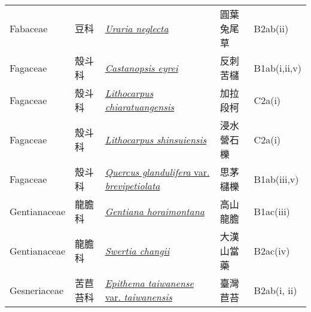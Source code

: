 {\begin{longtable}{L{2.5cm}L{2cm}L{5cm}L{2.5cm}L{3cm}}
    Fabaceae & 豆科 & \href{http://www.theplantlist.org/tpl1.1/search?q=Uraria+neglecta}{\textit{Uraria neglecta} } & 圓葉兔尾草 & B2ab(ii)    \\
    Fagaceae & 殼斗科 & \href{http://www.theplantlist.org/tpl1.1/search?q=Castanopsis+eyrei}{\textit{Castanopsis eyrei} } & 反刺苦櫧 & B1ab(i,ii,v)    \\
    Fagaceae & 殼斗科 & \href{http://www.theplantlist.org/tpl1.1/search?q=Lithocarpus+chiaratuangensis}{\textit{Lithocarpus chiaratuangensis} } & 加拉段柯 & C2a(i)    \\
    Fagaceae & 殼斗科 & \href{http://www.theplantlist.org/tpl1.1/search?q=Lithocarpus+shinsuiensis}{\textit{Lithocarpus shinsuiensis} } & 浸水營石櫟 & C2a(i)    \\
    Fagaceae & 殼斗科 & \href{http://www.theplantlist.org/tpl1.1/search?q=Quercus+glandulifera+var.+brevipetiolata}{\textit{Quercus glandulifera} var. \textit{brevipetiolata} } & 思茅櫧櫟 & B1ab(iii,v)    \\
    Gentianaceae & 龍膽科 & \href{http://www.theplantlist.org/tpl1.1/search?q=Gentiana+horaimontana}{\textit{Gentiana horaimontana} } & 高山龍膽 & B1ac(iii)    \\
    Gentianaceae & 龍膽科 & \href{http://www.theplantlist.org/tpl1.1/search?q=Swertia+changii}{\textit{Swertia changii} } & 大漢山當藥 & B2ac(iv)    \\
    Gesneriaceae & 苦苣苔科 & \href{http://www.theplantlist.org/tpl1.1/search?q=Epithema+taiwanense+var.+taiwanensis}{\textit{Epithema taiwanense} var. \textit{taiwanensis} } & 臺灣苣苔 & B2ab(i, ii)    \\

\end{longtable}}
